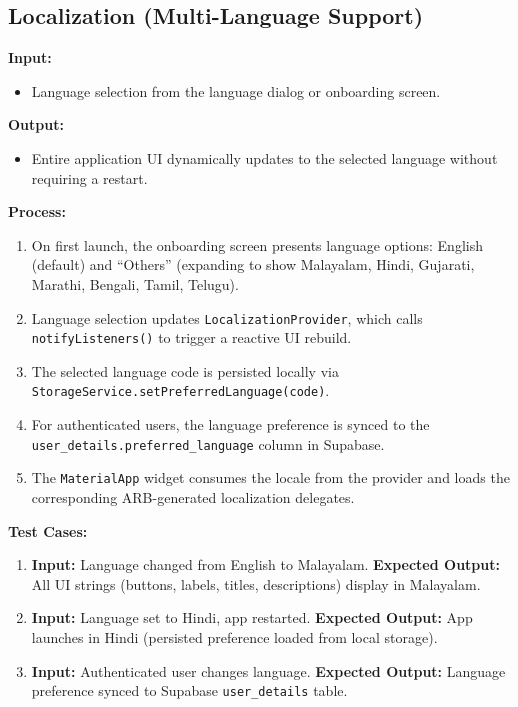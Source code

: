 \subsection{Localization (Multi-Language Support)}

\textbf{Input:}
\begin{itemize}
    \item Language selection from the language dialog or onboarding screen.
\end{itemize}

\textbf{Output:}
\begin{itemize}
    \item Entire application UI dynamically updates to the selected language without requiring a restart.
\end{itemize}

\textbf{Process:}
\begin{enumerate}
    \item On first launch, the onboarding screen presents language options: English (default) and ``Others'' (expanding to show Malayalam, Hindi, Gujarati, Marathi, Bengali, Tamil, Telugu).
    \item Language selection updates \texttt{LocalizationProvider}, which calls \newline \texttt{notifyListeners()} to trigger a reactive UI rebuild.
    \item The selected language code is persisted locally via \newline \texttt{StorageService.setPreferredLanguage(code)}.
    \item For authenticated users, the language preference is synced to the \newline \texttt{user\_details.preferred\_language} column in Supabase.
    \item The \texttt{MaterialApp} widget consumes the locale from the provider and loads the corresponding ARB-generated localization delegates.
\end{enumerate}

\textbf{Test Cases:}
\begin{enumerate}
    \item \textbf{Input:} Language changed from English to Malayalam. \textbf{Expected Output:} All UI strings (buttons, labels, titles, descriptions) display in Malayalam.

    \item \textbf{Input:} Language set to Hindi, app restarted. \textbf{Expected Output:} App launches in Hindi (persisted preference loaded from local storage).

    \item \textbf{Input:} Authenticated user changes language. \textbf{Expected Output:} Language preference synced to Supabase \texttt{user\_details} table.
\end{enumerate}

